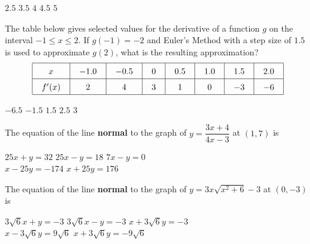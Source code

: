 \begin{questions}
    \begin{oneparchoices}
        \choice $2.5$
        \choice $3.5$
        \choice $4$
        \choice $4.5$
        \choice $5$
    \end{oneparchoices} \par \horizontalline

    \question The table below gives selected values for the derivative of a function $g$ on the interval $-1 \leq x \leq 2$. If $g(-1) = -2$ and Euler's Method with a step size of $1.5$ is used to approximate $g(2)$, what is the resulting approximation? \begin{align*}
        \arraycolsep=11pt\def\arraystretch{1.5}
        \begin{array}{|c|c|c|c|c|c|c|c|}
            \hline
            x & -1.0 & -0.5 & 0 & 0.5 & 1.0 & 1.5 & 2.0 \\ \hline
            f'(x) & 2 & 4 & 3 & 1 & 0 & -3 & -6 \\
            \hline
        \end{array}
    \end{align*}

    \begin{oneparchoices}
        \choice $-6.5$
        \choice $-1.5$
        \choice $1.5$
        \choice $2.5$
        \choice $3$
    \end{oneparchoices} \par \horizontalline

    \question The equation of the line \textbf{normal} to the graph of $y = \dfrac{3x + 4}{4x - 3}$ at $(1, 7)$ is \\

    \begin{oneparchoices}
        \choice $25x + y = 32$ 
        \choice $25x - y = 18$
        \choice $7x - y = 0$ \\[11pt]
        \makebox[0.23\textwidth] \choice $x - 25y = -174$ 
        \makebox[0.23\textwidth] \choice $x + 25y = 176$
    \end{oneparchoices} \par \horizontalline

    \question The equation of the line \textbf{normal} to the graph of $y = 3x\sqrt{x^2 + 6} - 3$ at $(0, -3)$ is \\

    \begin{oneparchoices}
        \choice $3\sqrt{6}x + y = -3$
        \choice $3\sqrt{6}x - y = -3$
        \choice $x + 3\sqrt{6}y = -3$ \\[11pt]
        \makebox[0.2\textwidth] \choice $x - 3\sqrt{6}y = 9\sqrt{6}$
        \makebox[0.23\textwidth] \choice $x + 3\sqrt{6}y = -9\sqrt{6}$
    \end{oneparchoices} \par \horizontalline
\end{questions}